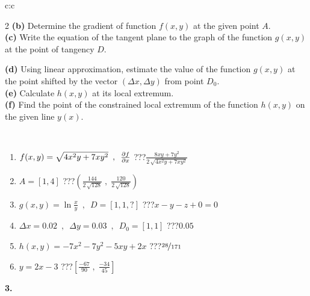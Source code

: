 \documentclass[10pt]{report}
\begin{document}
\begin{tabular}{c:c}
\begin{minipage}[c][104.5mm][t]{0.5\linewidth}
\begin{center}
\begin{minipage}{0.95\linewidth}
\begin{center}
{\begin{multicols}{2}
\textbf{(b)} Determine the gradient of function \(f(x,y)\) at the given point \(A\). \\[1mm]
\textbf{(c)} Write the equation of the tangent plane to the graph of the function \(g(x,y)\) at the point of tangency \(D\). \par \columnbreak
\textbf{(d)} Using linear approximation, estimate the value of the function \(g(x,y)\) at the point shifted by the vector \((\Delta x, \Delta y)\) from point \(D_0\). \\[1mm]
\textbf{(e)} Calculate \(h(x,y)\) at its local extremum. \\[1mm]
\textbf{(f)} Find the point of the constrained local extremum of the function \(h(x,y)\) on the given line \(y(x)\). \\[1mm]
\end{multicols}
}
\end{center}
\end{minipage}
\\[4mm]
\begin{minipage}{0.79\linewidth}
\begin{center}
\begin{varwidth}{\linewidth}
\begin{enumerate}
\normalsizerr
\item $f(x,y) = \sqrt{4x^2y + 7xy^2}\enspace , \enspace \pdv{f}{x}$\quad \dotfill\; ???\;\dotfill \quad $\frac{8xy+7y^2}{2\,\sqrt{4x^2y+7xy^2}}$
\item $A = [1, 4]$\quad \dotfill\; ???\;\dotfill \quad $\left( \frac{144}{2\,\sqrt{128}} \;,\; \frac{120}{2\,\sqrt{128}} \right)$
\item $g(x,y) = \ln\frac{x}{y} \enspace , \enspace D=[1,1,?]$\quad \dotfill\; ???\;\dotfill \quad $x - y - z + 0 = 0$
\item $\Delta x = {0.02} \enspace,\enspace \Delta y = {0.03} \enspace,\enspace D_0 = [1,1]$\quad \dotfill\; ???\;\dotfill \quad $0.05$
\item $h(x,y) = -7x^2-7y^2-5xy+2x$\quad \dotfill\; ???\;\dotfill \quad $\nicefrac{28}{171}$
\item $y = 2x-3$\quad \dotfill\; ???\;\dotfill \quad $\left[\frac{-67}{90}\;,\;\frac{-34}{45}\right]$
\end{enumerate}
\end{varwidth}
\end{center}
\end{minipage}
\begin{minipage}{0.20\linewidth}
\begin{center}
{\Huge\bfseries 3.} \\[2mm]

\end{center}
\end{minipage}
\end{center}
\end{minipage}
\end{tabular}
\end{document}
